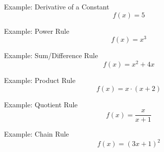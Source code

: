 \documentclass[aspectratio=169]{beamer}
\begin{document}
\begin{frame}{Example: Derivative of a Constant}\label{const_rule}
	\vspace{-4cm}    
    \[
    f(x) = 5
    \]
\end{frame}

\begin{frame}{Example: Power Rule}\label{power_rule}
	\vspace{-4cm}
    \[
    f(x) = x^3
    \]
\end{frame}

\begin{frame}{Example: Sum/Difference Rule}\label{sum_diff_rule}
	\vspace{-4cm}
    \[
    f(x) = x^2 + 4x
    \]
\end{frame}

\begin{frame}{Example: Product Rule}\label{product_rule}
	\vspace{-4cm}
    \[
    f(x) = x \cdot (x + 2)
    \]
\end{frame}

\begin{frame}{Example: Quotient Rule}\label{quotient_rule}
	\vspace{-4cm}
    \[
    f(x) = \frac{x}{x+1}
    \]
\end{frame}

\begin{frame}{Example: Chain Rule}\label{chain_rule}
	\vspace{-4cm}
    \[
    f(x) = (3x + 1)^2
    \]
\end{frame}
\end{document}
